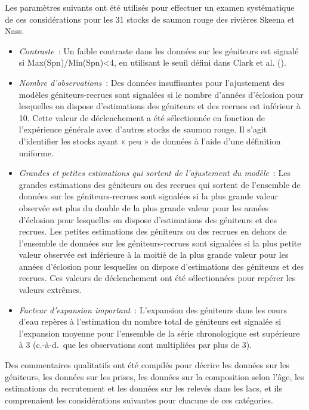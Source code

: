 \documentclass[french,11pt]{book}
\begin{document}
Les paramètres suivants ont été utilisés pour effectuer un examen systématique de ces considérations pour les 31 stocks de saumon rouge des rivières Skeena et Nass.
\begin{itemize}

\item
  \emph{Contraste}~: Un faible contraste dans les données sur les géniteurs est signalé si Max(Spn)/Min(Spn)\textless4, en utilisant le seuil défini dans Clark et al. ().
\item
  \emph{Nombre d'observations}~: Des données insuffisantes pour l'ajustement des modèles géniteurs-recrues sont signalées si le nombre d'années d'éclosion pour lesquelles on dispose d'estimations des géniteurs et des recrues est inférieur à 10. Cette valeur de déclenchement a été sélectionnée en fonction de l'expérience générale avec d'autres stocks de saumon rouge. Il s'agit d'identifier les stocks ayant « peu » de données à l'aide d'une définition uniforme.
\item
  \emph{Grandes et petites estimations qui sortent de l'ajustement du modèle}~: Les grandes estimations des géniteurs ou des recrues qui sortent de l'ensemble de données sur les géniteurs-recrues sont signalées si la plus grande valeur observée est plus du double de la plus grande valeur pour les années d'éclosion pour lesquelles on dispose d'estimations des géniteurs et des recrues. Les petites estimations des géniteurs ou des recrues en dehors de l'ensemble de données sur les géniteurs-recrues sont signalées si la plus petite valeur observée est inférieure à la moitié de la plus grande valeur pour les années d'éclosion pour lesquelles on dispose d'estimations des géniteurs et des recrues. Ces valeurs de déclenchement ont été sélectionnées pour repérer les valeurs extrêmes.
\item
  \emph{Facteur d'expansion important}~: L'expansion des géniteurs dans les cours d'eau repères à l'estimation du nombre total de géniteurs est signalée si l'expansion moyenne pour l'ensemble de la série chronologique est supérieure à 3 (c.-à-d.~que les observations sont multipliées par plus de 3).
\end{itemize}
Des commentaires qualitatifs ont été compilés pour décrire les données sur les géniteurs, les données sur les prises, les données sur la composition selon l'âge, les estimations du recrutement et les données sur les relevés dans les lacs, et ils comprenaient les considérations suivantes pour chacune de ces catégories.
\end{document}
